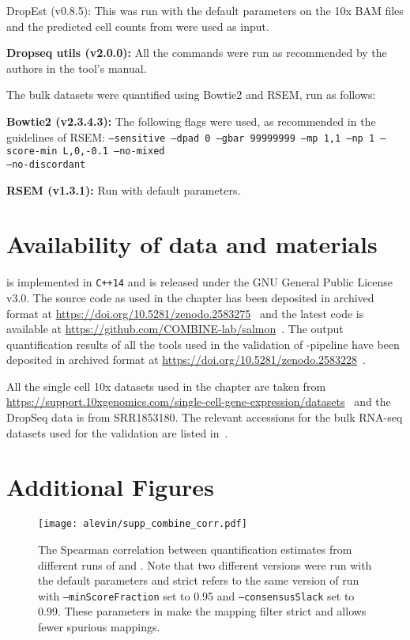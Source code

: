 DropEst (v0.8.5): This was run with the default parameters on the 10x BAM files and the predicted cell counts from \cellr were used as input.

\textbf{Dropseq utils (v2.0.0):} All the commands were run as recommended by the authors in the tool's manual.

The bulk datasets were quantified using Bowtie2 and RSEM, run as follows:

\textbf{Bowtie2 (v2.3.4.3):} The following flags were used, as recommended in the guidelines of RSEM: \texttt{--sensitive --dpad 0 --gbar 99999999 --mp 1,1 --np 1 --score-min L,0,-0.1 --no-mixed \\ --no-discordant}

\textbf{RSEM (v1.3.1):} Run with default parameters.



\section{Availability of data and materials}
\Alevin is implemented in \texttt{C++14} and is released under the GNU General Public License v3.0. The source code as used in the chapter has been deposited in archived format at \url{https://doi.org/10.5281/zenodo.2583275}~\citep{scode} and the latest code is available at \url{https://github.com/COMBINE-lab/salmon}~\citep{alvgit}. The output quantification results of all the tools used in the validation of \alevin-pipeline have been deposited in archived format at \url{https://doi.org/10.5281/zenodo.2583228}~\citep{vdata}.

All the single cell 10x datasets used in the chapter are taken from \url{https://support.10xgenomics.com/single-cell-gene-expression/datasets}~\citep{v2data} and the DropSeq data is from SRR1853180. The relevant accessions for the bulk RNA-seq datasets used for the validation are listed in~.

\newpage
\section{Additional Figures}
\begin{figure*}[!htb]
    \centering
  \texttt{[image: alevin/supp\_combine\_corr.pdf]}
  \caption{The Spearman correlation between quantification estimates from different runs of \alevin and \cellr. Note that two different versions \cellr were run with the default parameters and \alevin strict refers to the same version of \alevin run with \texttt{--minScoreFraction} set to 0.95 and \texttt{--consensusSlack} set to 0.99. These parameters in \alevin make the mapping filter strict and allows fewer spurious mappings.}
  \label{suppfig1}
\end{figure*}

